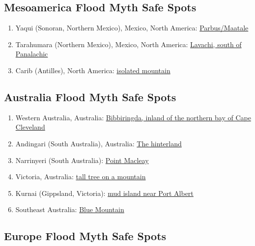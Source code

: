 \documentclass[10pt,twocolumn,letterpaper]{article}
\begin{document}
\subsection{Mesoamerica Flood Myth Safe Spots}

\begin{flushleft}
\begin{enumerate}
\item Yaqui (Sonoran, Northern Mexico), Mexico, North America: \href{http://www.talkorigins.org/faqs/flood-myths.html#Yaqui}{Parbus/Maatale}
\item Tarahumara (Northern Mexico), Mexico, North America: \href{http://www.talkorigins.org/faqs/flood-myths.html#Tarahumara}{Lavachi, south of Panalachic}
\item Carib (Antilles), North America: \href{http://www.talkorigins.org/faqs/flood-myths.html#Carib}{isolated mountain}
\end{enumerate}
\end{flushleft}

\subsection{Australia Flood Myth Safe Spots}

\begin{flushleft}
\begin{enumerate}
\item Western Australia, Australia: \href{http://www.talkorigins.org/faqs/flood-myths.html#MtElliot}{Bibbiringda, inland of the northern bay of Cape Cleveland}
\item Andingari (South Australia), Australia: \href{http://www.talkorigins.org/faqs/flood-myths.html#WestAustralia}{The hinterland}
\item Narrinyeri (South Australia): \href{http://www.talkorigins.org/faqs/flood-myths.html#Narrinyeri}{Point Macleay}
\item Victoria, Australia: \href{http://www.talkorigins.org/faqs/flood-myths.html#Victoria}{tall tree on a mountain}
\item Kurnai (Gippsland, Victoria): \href{http://www.talkorigins.org/faqs/flood-myths.html#Kurnai}{mud island near Port Albert}
\item Southeast Australia: \href{http://www.talkorigins.org/faqs/flood-myths.html#SEAustralia}{Blue Mountain}
\end{enumerate}
\end{flushleft}

\subsection{Europe Flood Myth Safe Spots}
\end{document}

